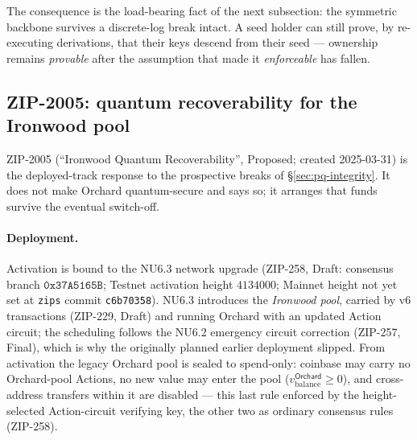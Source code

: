 \documentclass[11pt,a4paper]{article}
\theoremstyle{definition}
\begin{document}
The consequence is the load-bearing fact of the next subsection: the symmetric
backbone survives a discrete-log break intact. A seed holder can still prove,
by re-executing derivations, that their keys descend from their seed ---
ownership remains \emph{provable} after the assumption that made it
\emph{enforceable} has fallen.

\subsection{ZIP-2005: quantum recoverability for the Ironwood
pool}\label{sec:pq-zip2005}

ZIP-2005 (``Ironwood Quantum Recoverability'', Proposed; created 2025-03-31)
is the deployed-track response to the prospective breaks of
\S\ref{sec:pq-integrity}. It does not make Orchard quantum-secure and says so;
it arranges that funds survive the eventual switch-off.

\paragraph{Deployment.} Activation is bound to the NU6.3 network upgrade
(ZIP-258, Draft: consensus branch $\mathtt{0x37A5165B}$; Testnet activation
height $4134000$; Mainnet height not yet set at \texttt{zips} commit
\texttt{c6b70358}).
NU6.3 introduces the \emph{Ironwood pool}, carried by v6 transactions
(ZIP-229, Draft) and running Orchard with an updated Action circuit; the
scheduling follows the NU6.2 emergency circuit correction (ZIP-257, Final),
which is why the originally planned earlier deployment slipped. From
activation the legacy Orchard pool is sealed to spend-only: coinbase may carry
no Orchard-pool Actions, no new value may enter the pool
($v_{\mathrm{balance}}^{\mathsf{Orchard}} \ge 0$), and cross-address transfers
within it are disabled --- this last rule enforced by the height-selected
Action-circuit verifying key, the other two as ordinary consensus rules
(ZIP-258).
\end{document}
